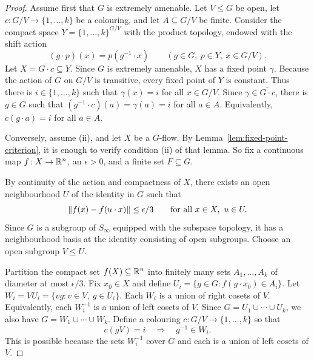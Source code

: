 \begin{proof}
    Assume first that \(G\) is extremely amenable. Let \(V\leq G\) be open, let \(c\colon G/V\to\{1,\dots,k\}\) be a colouring, and let \(A\subseteq G/V\) be finite. Consider the compact space \(Y=\{1,\dots,k\}^{G/V}\) with the product topology, endowed with the shift action
    \[
        (g\cdot p)(x)=p(g^{-1}\cdot x)
        \qquad
        (g\in G,\ p\in Y,\ x\in G/V).
    \]
    Let \(X=\overline{G\cdot c}\subseteq Y\). Since \(G\) is extremely amenable, \(X\) has a fixed point \(\gamma\). Because the action of \(G\) on \(G/V\) is transitive,
    every fixed point of \(Y\) is constant.
    Thus there is \(i\in\{1,\dots,k\}\) such that \(\gamma(x)=i\) for all \(x\in G/V\). Since \(\gamma\in\overline{G\cdot c}\), there is \(g\in G\) such that \((g^{-1}\cdot c)(a)=\gamma(a)=i\) for all \(a\in A\).
    Equivalently, \(c(g\cdot a)=i\) for all \(a\in A\).

    Conversely, assume (ii), and let \(X\) be a \(G\)-flow. By Lemma~\ref{lem:fixed-point-criterion}, it is enough to verify condition (ii) of that lemma. So fix a continuous map \(f\colon X\to\mathbb{R}^n\), an \(\epsilon>0\), and a finite set \(F\subseteq G\).

    By continuity of the action and compactness of \(X\), there exists an open neighbourhood \(U\) of the identity in \(G\) such that
    \[
        \left\lVert f(x)-f(u\cdot x)\right\rVert\leq \epsilon/3
        \qquad\text{for all } x\in X,\ u\in U.
    \]
    Since \(G\) is a subgroup of \(S_\infty\) equipped with the subspace topology, it has a neighbourhood basis at the identity consisting of open subgroups.
    Choose an open subgroup \(V\leq U\).

    Partition the compact set \(f(X)\subseteq\mathbb{R}^n\) into finitely many sets \(A_1,\dots,A_k\) of diameter at most \(\epsilon/3\). Fix \(x_0\in X\) and define \(U_i=\{g\in G : f(g\cdot x_0)\in A_i\}\). Let \(W_i=V U_i=\{vg : v\in V,\ g\in U_i\}\).
    Each \(W_i\) is a union of right cosets of \(V\). Equivalently, each \(W_i^{-1}\) is a union of left cosets of \(V\). Since \(G=U_1\cup\cdots\cup U_k\), we also have \(G=W_1\cup\cdots\cup W_k\).
    Define a colouring \(c\colon G/V\to\{1,\dots,k\}\) so that
    \[
        c(gV)=i
        \quad\Longrightarrow\quad
        g^{-1}\in W_i.
    \]
    This is possible because the sets \(W_i^{-1}\) cover \(G\) and each is a union of left cosets of \(V\).


\end{proof}
